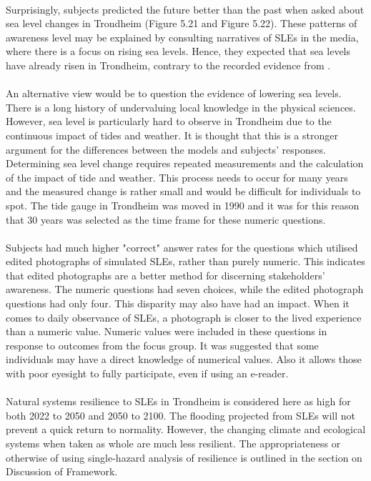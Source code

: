 \paragraph{}
Surprisingly, subjects predicted the future better than the past when asked about sea level changes in Trondheim (Figure 5.21 and Figure 5.22). These patterns of awareness level may be explained by consulting narratives of SLEs in the media, where there is a focus on rising sea levels. Hence, they expected that sea levels have already risen in Trondheim, contrary to the recorded evidence from \cite{tides_high_2022}.


\paragraph{}
An alternative view would be to question the evidence of lowering sea levels. There is a long history of undervaluing local knowledge in the physical sciences. However, sea level is particularly hard to observe in Trondheim due to the continuous impact of tides and weather. It is thought that this is a stronger argument for the differences between the models and subjects' responses. Determining sea level change requires repeated measurements and the calculation of the impact of tide and weather. This process needs to occur for many years and the measured change is rather small and would be difficult for individuals to spot. The tide gauge in Trondheim was moved in 1990 and it was for this reason that 30 years was selected as the time frame for these numeric questions. 

\paragraph{}
Subjects had much higher "correct" answer rates for the questions which utilised edited photographs of simulated SLEs, rather than purely numeric. This indicates that edited photographs are a better method for discerning stakeholders' awareness. The numeric questions had seven choices, while the edited photograph questions had only four. This disparity may also have had an impact. When it comes to daily observance of SLEs, a photograph is closer to the lived experience than a numeric value. Numeric values were included in these questions in response to outcomes from the focus group. It was suggested that some individuals may have a direct knowledge of numerical values. Also it allows those with poor eyesight to fully participate, even if using an e-reader.
\paragraph{}
Natural systems resilience to SLEs in Trondheim is considered here as high for both 2022 to 2050 and 2050 to 2100. The flooding projected from SLEs will not prevent a quick return to normality. However, the changing climate and ecological systems when taken as whole are much less resilient. The appropriateness or otherwise of using single-hazard analysis of resilience is outlined in the section on Discussion of Framework.



